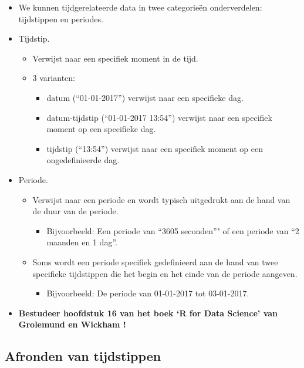 \documentclass[]{tufte-book}
\providecommand{\tightlist}{%
  \setlength{\itemsep}{0pt}\setlength{\parskip}{0pt}}
\begin{document}
\begin{itemize}
\tightlist
\item
  We kunnen tijdgerelateerde data in twee categorieën onderverdelen: tijdstippen en periodes.
\item
  Tijdstip.

  \begin{itemize}
  \tightlist
  \item
    Verwijst naar een specifiek moment in de tijd.
  \item
    3 varianten:

    \begin{itemize}
    \tightlist
    \item
      datum (``01-01-2017'') verwijst naar een specifieke dag.
    \item
      datum-tijdstip (``01-01-2017 13:54'') verwijst naar een specifiek moment op een specifieke dag.
    \item
      tijdstip (``13:54'') verwijst naar een specifiek moment op een ongedefinieerde dag.
    \end{itemize}
  \end{itemize}
\item
  Periode.

  \begin{itemize}
  \tightlist
  \item
    Verwijst naar een periode en wordt typisch uitgedrukt aan de hand van de duur van de periode.

    \begin{itemize}
    \tightlist
    \item
      Bijvoorbeeld: Een periode van ``3605 seconden''" of een periode van ``2 maanden en 1 dag''.
    \end{itemize}
  \item
    Soms wordt een periode specifiek gedefinieerd aan de hand van twee specifieke tijdstippen die het begin en het einde van de periode aangeven.

    \begin{itemize}
    \tightlist
    \item
      Bijvoorbeeld: De periode van 01-01-2017 tot 03-01-2017.
    \end{itemize}
  \end{itemize}
\item
  \textbf{Bestudeer hoofdstuk 16 van het boek `R for Data Science' van Grolemund en Wickham !}
\end{itemize}

\hypertarget{afronden-van-tijdstippen}{%
\subsection{Afronden van tijdstippen}\label{afronden-van-tijdstippen}}
\end{document}
